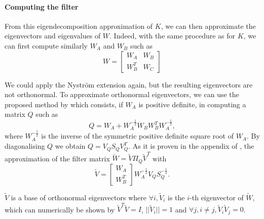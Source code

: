 \paragraph{Computing the filter}
From this eigendecomposition approximation of \(K\), we can then approximate the eigenvectors and eigenvalues of \(W\).
Indeed, with the same procedure as for \(K\), we can first compute similarly \(W_A\) and \(W_B\) such as
\[
 W = \begin{bmatrix}
  W_A & W_B \\
  W_B^T & W_C
 \end{bmatrix}
\]

We could apply the Nystr\"om extension again, but the resulting eigenvectors are not orthonormal.
To approximate orthonormal eigenvectors, we can use the proposed method by \cite{fowlkes_spectral_2004} which consists, if \(W_A\) is positive definite, in computing a matrix \(Q\) such as
\[Q = W_A + W_A^{-\frac{1}{2}} W_B W_B^T W_A^{-\frac{1}{2}},\]
where \(W_A^{-\frac{1}{2}}\) is the inverse of the symmetric positive definite square root of \(W_A\).
By diagonalising \(Q\) we obtain \(Q = V_Q S_Q V_Q^T\).
As it is proven in the appendix of \cite{fowlkes_spectral_2004}, the approximation of the filter matrix \(\tilde{W} = \tilde{V} \Pi_Q \tilde{V}^T\) with
\[
 \tilde{V} = \begin{bmatrix}
  W_A \\
  W_B^T
 \end{bmatrix}
 W_A^{-\frac{1}{2}} V_Q S_Q^{-\frac{1}{2}}.
\]

\(\tilde{V}\) is a base of orthonormal eigenvectors where \(\forall i, \tilde{V}_i\) is the \(i\)-th eigenvector of \(\tilde{W}\), which can numerically be shown by \(\tilde{V}^T \tilde{V} = I\), \(||\tilde{V}_i|| = 1\) and \(\forall j, i \neq j, \tilde{V}_i \tilde{V}_j = 0\).


